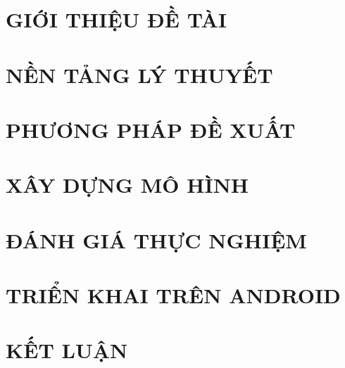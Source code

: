 \documentclass[a4paper,13pt,3p,twoside]{report}
\renewcommand{\bibname}{Danh_sach_tai_lieu_tham_khao}
\theoremstyle{definition}
\begin{document}
\glsaddall 
\renewcommand*{\acronymname}{DANH MỤC THUẬT NGỮ VÀ TỪ VIẾT TẮT}
\renewcommand*{\entryname}{Thuật ngữ}
\renewcommand*{\descriptionname}{Ý nghĩa}
\printnoidxglossaries

\renewcommand\appendixname{PHỤ LỤC}
\renewcommand\appendixpagename{PHỤ LỤC}
\renewcommand\appendixtocname{PHỤ LỤC}





\newpage
{}

\pagestyle{fancy}
\fancyhf{}
\fancyhead[RE, LO]{\leftmark}
\fancyfoot[RE, LO]{\thepage}

\chapter{GIỚI THIỆU ĐỀ TÀI}

\newpage
\chapter{NỀN TẢNG LÝ THUYẾT}



\newpage
\chapter{PHƯƠNG PHÁP ĐỀ XUẤT}


\newpage
\chapter{XÂY DỰNG MÔ HÌNH}


\newpage
\chapter{ĐÁNH GIÁ THỰC NGHIỆM}


\newpage
\chapter{TRIỂN KHAI TRÊN ANDROID}

    
\newpage
\chapter{KẾT LUẬN}



\newpage
\renewcommand\bibname{TÀI LIỆU THAM KHẢO}
\printbibliography
{}
\end{document}
